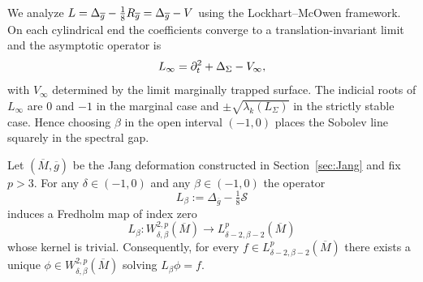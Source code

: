 We analyze $L = \Delta_{\overline{g}} - \tfrac{1}{8}R_{\overline{g}} = \Delta_{\overline{g}} - V$ using the Lockhart--McOwen framework.  On each cylindrical end the coefficients converge to a translation-invariant limit and the asymptotic operator is
\begin{equation}
    L_\infty = \partial_t^2 + \Delta_\Sigma - V_\infty,
\end{equation}
with $V_\infty$ determined by the limit marginally trapped surface.  The indicial roots of $L_\infty$ are $0$ and $-1$ in the marginal case and $\pm \sqrt{\lambda_k(L_\Sigma)}$ in the strictly stable case.  Hence choosing $\beta$ in the open interval $(-1,0)$ places the Sobolev line squarely in the spectral gap.

\begin{theorem}\label{lem:LichnerowiczWellPosed}
Let $(\overline M, \overline g)$ be the Jang deformation constructed in Section~\ref{sec:Jang} and fix $p>3$.  For any $\delta \in (-1,0)$ and any $\beta \in (-1,0)$ the operator
\[
    L_{\beta} := \Delta_{\overline g} - \tfrac18 \mathcal{S}
\]
induces a Fredholm map of index zero
\[
    L_{\beta} : W^{2,p}_{\delta,\beta}(\overline M) \longrightarrow L^p_{\delta-2,\beta-2}(\overline M)
\]
whose kernel is trivial.  Consequently, for every $f \in L^p_{\delta-2,\beta-2}(\overline M)$ there exists a unique $\phi \in W^{2,p}_{\delta,\beta}(\overline M)$ solving $L_{\beta}\phi = f$.
\end{theorem}

